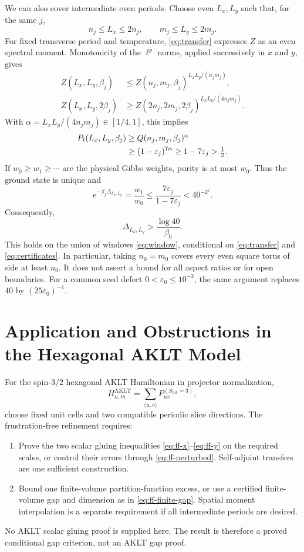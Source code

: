 \documentclass[11pt]{article}
\newcommand{\ee}{\varepsilon}
\begin{document}
We can also cover intermediate even periods. Choose even \(L_x,L_y\)
such that, for the same \(j\),
\begin{equation}
	n_j\le L_x\le2n_j,\qquad m_j\le L_y\le2m_j.
	\label{eq:window}
\end{equation}
For fixed transverse period and temperature, \eqref{eq:transfer}
expresses \(Z\) as an even spectral moment. Monotonicity of the
\(\ell^p\) norms, applied successively in \(x\) and \(y\), gives
\begin{align*}
	Z(L_x,L_y,\beta_j)
	 & \le Z(n_j,m_j,\beta_j)^{L_xL_y/(n_jm_j)},     \\
	Z(L_x,L_y,2\beta_j)
	 & \ge Z(2n_j,2m_j,2\beta_j)^{L_xL_y/(4n_jm_j)}.
\end{align*}
With \(\alpha=L_xL_y/(4n_jm_j)\in[1/4,1]\), this implies
\begin{align}
	P_t(L_x,L_y,\beta_j)
	 & \ge Q(n_j,m_j,\beta_j)^\alpha\notag         \\
	 & \ge(1-\ee_j)^{7\alpha}\ge1-7\ee_j>\tfrac12.
	\label{eq:interpolation}
\end{align}
If \(w_0\ge w_1\ge\cdots\) are the physical Gibbs weights, purity
is at most \(w_0\). Thus the ground state is unique and
\[
	e^{-\beta_j\Delta_{L_x,L_y}}
	=\frac{w_1}{w_0}
	\le\frac{7\ee_j}{1-7\ee_j}
	<40^{-2^j}.
\]
Consequently,
\begin{equation}
	\boxed{\Delta_{L_x,L_y}>\frac{\log40}{\beta_0}.}
	\label{eq:gap}
\end{equation}
This holds on the union of windows \eqref{eq:window}, conditional on
\eqref{eq:transfer} and \eqref{eq:certificates}. In particular, taking
\(n_0=m_0\) covers every even square torus of side at least \(n_0\).
It does not assert a bound for all aspect ratios or for open boundaries.
For a common seed defect \(0<\ee_0\le10^{-3}\), the same argument
replaces \(40\) by \((25\ee_0)^{-1}\).

\section{Application and Obstructions in the Hexagonal AKLT Model}

For the spin-\(3/2\) hexagonal AKLT Hamiltonian in projector
normalization,
\[
	H_{n,m}^{\mathrm{AKLT}}=\sum_{\langle u,v\rangle}
	P_{uv}^{(S_{\mathrm{tot}}=3)},
\]
choose fixed unit cells and two compatible periodic slice directions.
The frustration-free refinement requires:
\begin{enumerate}
	\item Prove the two scalar gluing inequalities
	      \eqref{eq:ff-x}--\eqref{eq:ff-y} on the required scales, or
	      control their errors through \eqref{eq:ff-perturbed}.
	      Self-adjoint transfers are one sufficient construction.
	\item Bound one finite-volume partition-function excess, or use a
	      certified finite-volume gap and dimension as in
	      \eqref{eq:ff-finite-gap}. Spatial moment interpolation is a
	      separate requirement if all intermediate periods are desired.
\end{enumerate}
No AKLT scalar gluing proof is supplied here. The result is therefore
a proved conditional gap criterion, not an AKLT gap proof.
\end{document}
